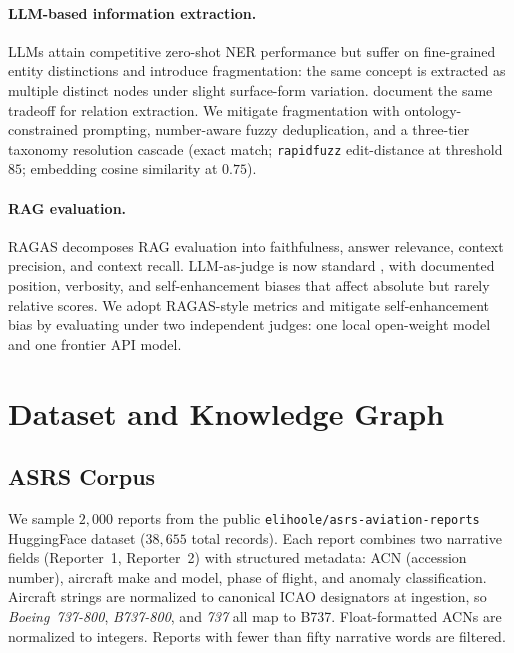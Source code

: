\documentclass[10pt,a4paper]{article}
\begin{document}
\paragraph{LLM-based information extraction.}
LLMs attain competitive zero-shot NER performance \citep{wei2023llmie}
but suffer on fine-grained entity distinctions and introduce
fragmentation: the same concept is extracted as multiple distinct
nodes under slight surface-form variation. \citet{wadhwa2023relations}
document the same tradeoff for relation extraction. We mitigate
fragmentation with ontology-constrained prompting, number-aware fuzzy
deduplication, and a three-tier taxonomy resolution cascade (exact
match; \texttt{rapidfuzz} edit-distance at threshold $85$; embedding
cosine similarity at $0.75$).

\paragraph{RAG evaluation.}
RAGAS \citep{es2024ragas} decomposes RAG evaluation into
faithfulness, answer relevance, context precision, and context
recall. LLM-as-judge is now standard \citep{zheng2024judgingllm}, with
documented position, verbosity, and self-enhancement biases that
affect absolute but rarely relative scores. We adopt RAGAS-style
metrics and mitigate self-enhancement bias by evaluating under two
independent judges: one local open-weight model and one frontier API
model.

\section{Dataset and Knowledge Graph}
\label{sec:data}

\subsection{ASRS Corpus}

We sample $2{,}000$ reports from the public
\texttt{elihoole/asrs-aviation-reports} HuggingFace dataset
($38{,}655$ total records). Each report combines two narrative fields
(Reporter~1, Reporter~2) with structured metadata: ACN (accession
number), aircraft make and model, phase of flight, and anomaly
classification. Aircraft strings are normalized to canonical ICAO
designators at ingestion, so \emph{Boeing~737-800}, \emph{B737-800},
and \emph{737} all map to \textsc{B737}. Float-formatted ACNs are
normalized to integers. Reports with fewer than fifty narrative words
are filtered.
\end{document}
